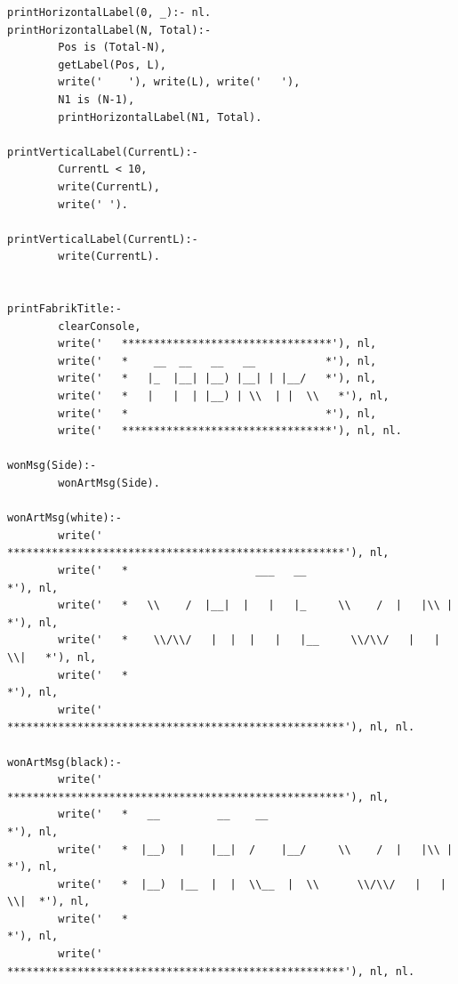 \documentclass[a4paper]{article}
\begin{document}
\begin{lstlisting}
printHorizontalLabel(0, _):- nl.
printHorizontalLabel(N, Total):-
        Pos is (Total-N),
        getLabel(Pos, L),
        write('    '), write(L), write('   '),
        N1 is (N-1),
        printHorizontalLabel(N1, Total).        

printVerticalLabel(CurrentL):-
        CurrentL < 10,
        write(CurrentL),
        write(' ').

printVerticalLabel(CurrentL):-
        write(CurrentL).


printFabrikTitle:-
        clearConsole,
        write('   *********************************'), nl,
        write('   *    __  __   __   __           *'), nl,
        write('   *   |_  |__| |__) |__| | |__/   *'), nl,
        write('   *   |   |  | |__) | \\  | |  \\   *'), nl,
        write('   *                               *'), nl,
        write('   *********************************'), nl, nl.

wonMsg(Side):-
        wonArtMsg(Side).

wonArtMsg(white):-
        write('   *****************************************************'), nl,
        write('   *                    ___   __                       *'), nl,
        write('   *   \\    /  |__|  |   |   |_     \\    /  |   |\\ |   *'), nl,
        write('   *    \\/\\/   |  |  |   |   |__     \\/\\/   |   | \\|   *'), nl,
        write('   *                                                   *'), nl,
        write('   *****************************************************'), nl, nl.

wonArtMsg(black):-
        write('   *****************************************************'), nl,
        write('   *   __         __    __                             *'), nl,
        write('   *  |__)  |    |__|  /    |__/     \\    /  |   |\\ |  *'), nl,
        write('   *  |__)  |__  |  |  \\__  |  \\      \\/\\/   |   | \\|  *'), nl,
        write('   *                                                   *'), nl,
        write('   *****************************************************'), nl, nl.
\end{lstlisting}
\newpage
\end{document}
